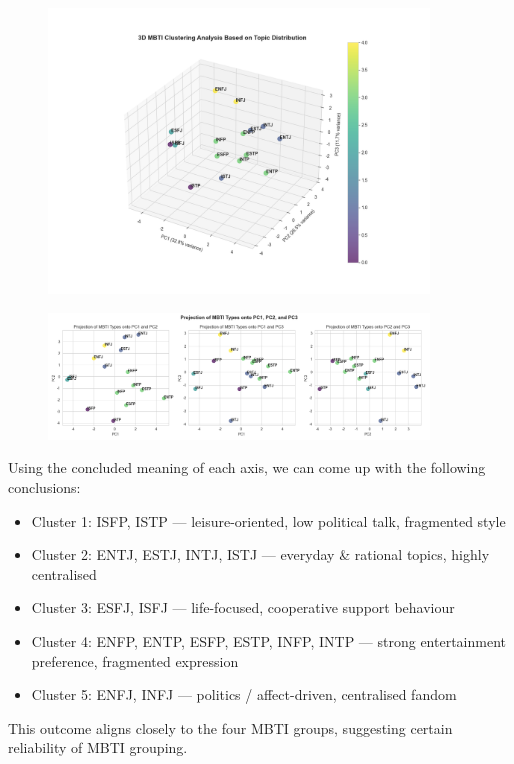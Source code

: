 \documentclass[12pt]{article}
\numberwithin{figure}{section}  %
\begin{document}
	\begin{figure}[H]
			\centering
			\includegraphics[width=0.9\textwidth]{Q23D} 	
	\end{figure}
	\begin{figure}[H]
			\centering
			\includegraphics[width=0.9\textwidth]{Q22D} 	
	\end{figure}
	
	Using the concluded meaning of each axis, we can come up with the following conclusions:
	\begin{itemize}
	\item Cluster 1: ISFP, ISTP — leisure-oriented, low political talk,
	fragmented style
	\item Cluster 2: ENTJ, ESTJ, INTJ, ISTJ — everyday \& rational topics,
	highly centralised
	\item Cluster 3: ESFJ, ISFJ — life-focused, cooperative support behaviour
	\item Cluster 4: ENFP, ENTP, ESFP, ESTP, INFP, INTP — strong entertainment
	preference, fragmented expression
	\item Cluster 5: ENFJ, INFJ — politics / affect-driven, centralised fandom
	\end{itemize}
	
	This outcome aligns closely to the four MBTI groups, suggesting certain
	reliability of MBTI grouping.
	
\end{document}
